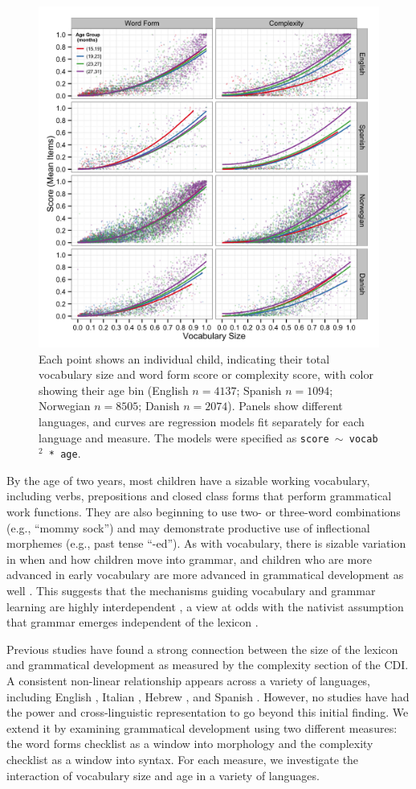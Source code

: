 \documentclass[10pt,letterpaper]{article}
\begin{document}
\begin{figure}[t!]
\centering
\includegraphics[width=.75\textwidth]{plots/grammar.png}
\caption{\label{fig:grammar} Each point shows an individual child, indicating their total vocabulary size and word form score or complexity score, with color showing their age bin (English $n=4137$; Spanish $n=1094$; Norwegian $n=8505$; Danish $n=2074$). Panels show different languages, and curves are regression models fit separately for each language and measure. The models were specified as \small{\tt{score $\sim$ vocab$^{2}$ * age}}.} 
\end{figure}

By the age of two years, most children have a sizable working vocabulary, including verbs, prepositions and closed class forms that perform grammatical work functions. They are also beginning to use two- or three-word combinations (e.g., ``mommy sock'') and may demonstrate productive use of inflectional morphemes (e.g., past tense ``-ed''). As with vocabulary, there is sizable variation in when and how children move into grammar, and children who are more advanced in early vocabulary are more advanced in grammatical development as well \cite{bates1999}. This suggests that the mechanisms guiding vocabulary and grammar learning are highly interdependent \cite{tomasello2003,bresnan2001}, a view at odds with the nativist assumption that grammar emerges independent of the lexicon \cite{chomsky1981}.

Previous studies have found a strong connection between the size of the lexicon and grammatical development as measured by the complexity section of the CDI. A consistent non-linear relationship appears across a variety of languages, including English \cite{bates1994,fenson1994}, Italian \cite{caselli1999}, Hebrew \cite{maital2000}, and Spanish \cite{jackson-maldonado2003}. However, no studies have had the power and cross-linguistic representation to go beyond this initial finding. We extend it by examining grammatical development using two different measures: the word forms checklist as a window into morphology and the complexity checklist as a window into syntax. For each measure, we investigate the interaction of vocabulary size and age in a variety of languages.
\end{document}
